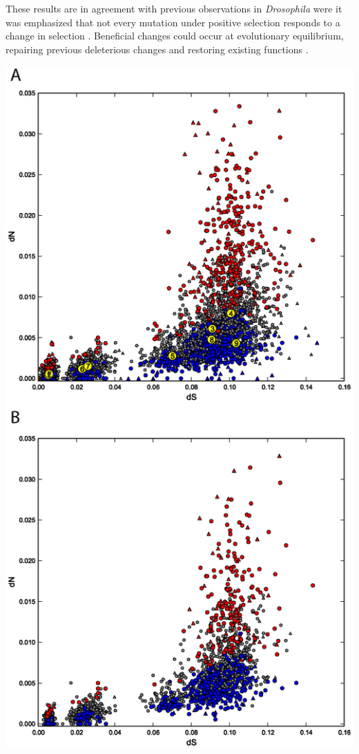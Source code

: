 These results are in agreement with previous observations in \textit{Drosophila} were it was emphasized that not every mutation under positive selection responds to a change in selection \cite{Images2009}. Beneficial changes could occur at evolutionary equilibrium, repairing previous deleterious changes and restoring existing functions \cite{Images2009}.

\begin{FPfigure}
\centering 
\includegraphics[height=\textheight]{tex_source/figures/gssa/gssa_psgs.png}

\end{FPfigure}
